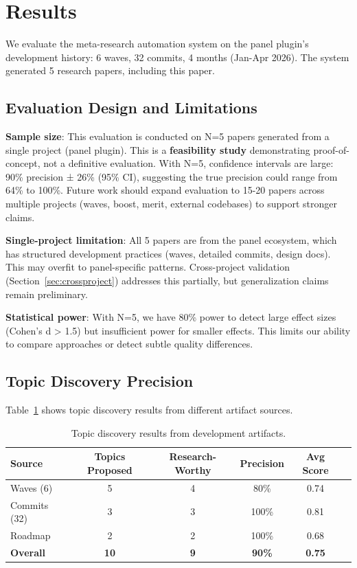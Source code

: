 \section{Results}
\label{sec:results}

We evaluate the meta-research automation system on the panel plugin's development history: 6 waves, 32 commits, 4 months (Jan-Apr 2026). The system generated 5 research papers, including this paper.

\subsection{Evaluation Design and Limitations}

\textbf{Sample size}: This evaluation is conducted on N=5 papers generated from a single project (panel plugin). This is a \textbf{feasibility study} demonstrating proof-of-concept, not a definitive evaluation. With N=5, confidence intervals are large: 90\% precision ± 26\% (95\% CI), suggesting the true precision could range from 64\% to 100\%. Future work should expand evaluation to 15-20 papers across multiple projects (waves, boost, merit, external codebases) to support stronger claims.

\textbf{Single-project limitation}: All 5 papers are from the panel ecosystem, which has structured development practices (waves, detailed commits, design docs). This may overfit to panel-specific patterns. Cross-project validation (Section~\ref{sec:crossproject}) addresses this partially, but generalization claims remain preliminary.

\textbf{Statistical power}: With N=5, we have 80\% power to detect large effect sizes (Cohen's d > 1.5) but insufficient power for smaller effects. This limits our ability to compare approaches or detect subtle quality differences.

\subsection{Topic Discovery Precision}

Table~\ref{tab:discovery} shows topic discovery results from different artifact sources.

\begin{table}[t]
\centering
\caption{Topic discovery results from development artifacts.}
\label{tab:discovery}
\begin{tabular}{lccccc}
\toprule
Source & Topics Proposed & Research-Worthy & Precision & Avg Score \\
\midrule
Waves (6) & 5 & 4 & 80\% & 0.74 \\
Commits (32) & 3 & 3 & 100\% & 0.81 \\
Roadmap & 2 & 2 & 100\% & 0.68 \\
\midrule
\textbf{Overall} & \textbf{10} & \textbf{9} & \textbf{90\%} & \textbf{0.75} \\
\bottomrule
\end{tabular}
\end{table}

